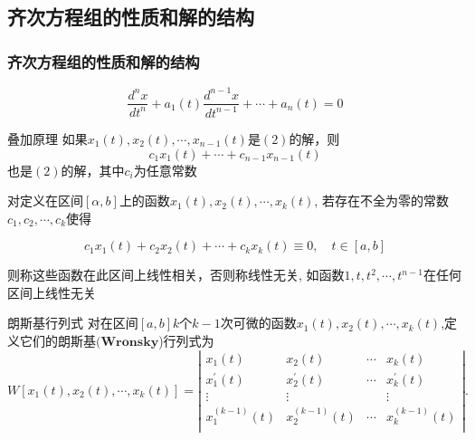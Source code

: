\documentclass[aspectratio=169, 10pt, utf8, mathserif]{beamer}
\begin{document}
	\subsection{齐次方程组的性质和解的结构}
	\begin{frame}
		\frametitle{齐次方程组的性质和解的结构}
		\begin{equation}
			\frac{d^nx}{dt^n}+a_1\left( t \right) \frac{d^{n-1}x}{dt^{n-1}}+\cdots +a_n\left( t \right) =0
		\end{equation}
			\begin{block}{叠加原理}
			如果$x_{1}(t), x_{2}(t),\cdots,x_{n-1}(t)$是$(2)$的解，则
			\begin{equation}
				c_1x_1\left( t \right) +\cdots +c_{n-1}x_{n-1}\left( t \right) 
			\end{equation}
			也是$(2)$的解，其中$c_{i}$为任意常数
		\end{block}
		对定义在区间$[\alpha,b]$上的函数$x_1(t),x_2(t),\cdots,x_k(t)$, 若存在不全为零的常数$c_1,c_2,\cdots,c_k$使得
		
		\begin{equation}
			c_1x_1(t)+c_2x_2(t)+\cdots+c_kx_k(t)\equiv0,\quad t\in[a,b]
		\end{equation}
	
		则称这些函数在此区间上线性相关，否则称线性无关,
		如函数$1,t,t^2,\cdots,t^{n-1}$在任何区间上线性无关
	\end{frame}
	\begin{frame}
		\begin{exampleblock}{朗斯基行列式}
		对在区间$[a,b]$$k$个$k-1$次可微的函数$x_1(t),x_2(t),\cdots,x_k(t)$,定义它们的朗斯基$(\mathbf{Wronsky}$)行列式为
		\begin{equation*}
			W[x_1(t),x_2(t),\cdots ,x_k(t)]=\left| \begin{matrix}
				x_1(t)&		x_2(t)&		\cdots&		x_k(t)\\
				x_{1}^{\prime}(t)&		x_{2}^{\prime}(t)&		\cdots&		x_{k}^{\prime}(t)\\
				\vdots&		\vdots&		&		\vdots\\
				x_{1}^{(k-1)}(t)&		x_{2}^{(k-1)}(t)&		\cdots&		x_{k}^{(k-1)}(t)\\
			\end{matrix} \right|.
		\end{equation*}
		\end{exampleblock}
	\end{frame}
\end{document}
